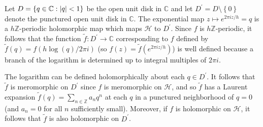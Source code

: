 \documentclass[10pt,leqno,twoside]{article}
\theoremstyle{plain}
\theoremstyle{definition}
\numberwithin{equation}{section}
\numberwithin{lem}{section}
\newcommand{\cbr}[1]{\left\{#1\right\}}
\begin{document}
Let $D = \cbr{q\in\mathbb C : \abs{q} <1}$ be the open unit disk in $\mathbb C$ and let $D^\prime = D \setminus \!\cbr{0}$ denote the punctured open unit disk in $\mathbb C$. The exponential map $z\mapsto e^{2\pi i z/h} = q$ is a $h\mathbb{Z}$-periodic holomorphic map which maps $\mathcal H$ to $D^\prime$. Since $f$ is $h\mathbb{Z}$-periodic, it follows that the function $\tilde f\colon D^\prime\to\mathbb C$ corresponding to $f$ defined by $\tilde f(q) = f(h\log (q)/2\pi i)$ (so $f(z) = \tilde f(e^{2\pi i z/h})$) is well defined because a branch of the logarithm is determined up to integral multiples of $2\pi i$.

The logarithm can be defined holomorphically about each $q\in D^\prime$. It follows that $\tilde f$ is meromorphic on $D^\prime$ since $f$ is meromorphic on $\mathcal H$, and so $\tilde f$ has a Laurent expansion $\tilde f(q) = \sum_{n\in\mathbb Z}a_nq^n$ at each $q$ in a punctured neighborhood of $q=0$ (and $a_n = 0$ for all $n$ sufficiently small). Moreover, if $f$ is holomorphic on $\mathcal H$, it follows that $\tilde f$ is also holomorphic on $D^\prime$.
\end{document}
